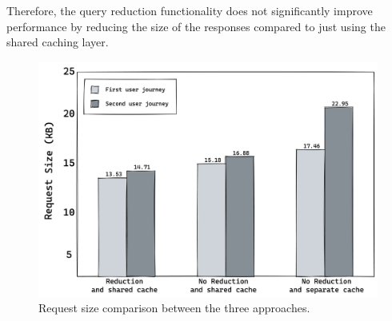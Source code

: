 \bigskip

\noindent Therefore, the query reduction functionality does not significantly improve performance by reducing the size of the responses compared to just using the shared caching layer.


\ifshowImages
\begin{figure}[H]
  \centering
  \includegraphics[width=0.9\linewidth]{images/discussion/request-size.png}
  \caption{Request size comparison between the three approaches.}\label{fig:discussion:request-size}
\end{figure}
\fi

